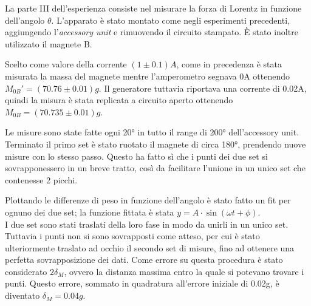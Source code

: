 {\fontsize{12}{14}\selectfont 

La parte III dell'esperienza consiste nel misurare la forza di Lorentz in funzione dell'angolo $\theta$. L'apparato è stato montato come negli esperimenti precedenti, aggiungendo l'\emph{accessory unit} e rimuovendo il circuito stampato. È stato inoltre utilizzato il magnete B.
\par
Scelto come valore della corrente $(1 \pm 0.1) A$, come in precedenza è stata misurata la massa del magnete mentre l'amperometro segnava 0A ottenendo $M_{0B}' = (70.76 \pm 0.01) g$. Il generatore tuttavia riportava una corrente di 0.02A, quindi la misura è stata replicata a circuito aperto ottenendo $M_{0B} = (70.735 \pm 0.01) g$.
\par
Le misure sono state fatte ogni 20° in tutto il range di 200° dell'accessory unit. Terminato il primo set è stato ruotato il magnete di circa 180°, prendendo nuove misure con lo stesso passo. Questo ha fatto sì che i punti dei due set si sovrapponessero in un breve tratto, così da facilitare l'unione in un unico set che contenesse 2 picchi.
\par
Plottando le differenze di peso in funzione dell'angolo è stato fatto un fit per ognuno dei due set; la funzione fittata è stata $y = A\cdot \sin(\omega t + \phi)$.
\\
I due set sono stati traslati della loro fase in modo da unirli in un unico set. Tuttavia i punti non si sono sovrapposti come atteso, per cui è stato ulteriormente traslato ad occhio il secondo set di misure, fino ad ottenere una perfetta sovrapposizione dei dati. Come errore su questa procedura è stato considerato $2\delta_{M}$, ovvero la distanza massima entro la quale si potevano trovare i punti. Questo errore, sommato in quadratura all'errore iniziale di 0.02g, è diventato $\delta_M = 0.04g$.

\par}